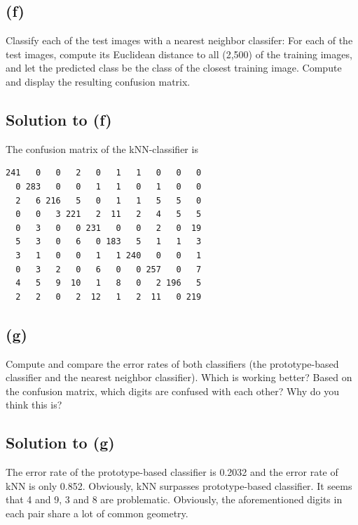 \documentclass[10pt]{article}
\begin{document}
\subsection*{(f)}
\color{blue}
Classify each of the test images with a nearest neighbor classifer: For each of the test images, compute its Euclidean distance to all (2,500) of the training images, and let the predicted class be the class of the closest training image. Compute and display the resulting confusion matrix.
\color{black}

\subsection*{Solution to (f)}
The confusion matrix of the kNN-classifier is
\begin{verbatim}
241   0   0   2   0   1   1   0   0   0
  0 283   0   0   1   1   0   1   0   0
  2   6 216   5   0   1   1   5   5   0
  0   0   3 221   2  11   2   4   5   5
  0   3   0   0 231   0   0   2   0  19
  5   3   0   6   0 183   5   1   1   3
  3   1   0   0   1   1 240   0   0   1
  0   3   2   0   6   0   0 257   0   7
  4   5   9  10   1   8   0   2 196   5
  2   2   0   2  12   1   2  11   0 219
\end{verbatim}

\subsection*{(g)}
\color{blue}
Compute and compare the error rates of both classifiers (the prototype-based classifier and the nearest neighbor classifier). Which is working better?  Based on the confusion matrix, which digits are confused with each other? Why do you think this is?
\color{black}

\subsection*{Solution to (g)}
The error rate of the prototype-based classifier is 0.2032 and the error rate of kNN is only 0.852. Obviously, kNN surpasses prototype-based classifier. It seems that 4 and 9, 3 and 8 are problematic. Obviously, the aforementioned digits in each pair share a lot of common geometry.
\end{document}
